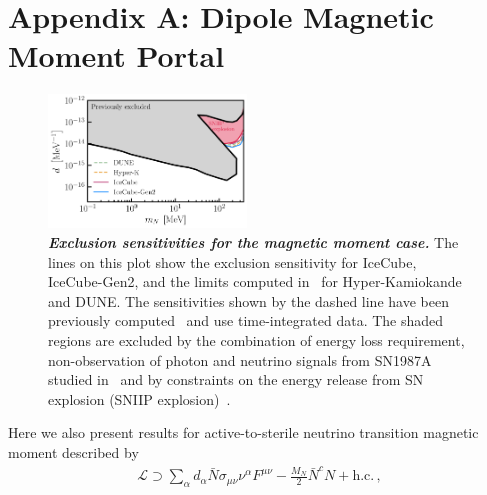 \documentclass[aps,twocolumn,prl,showpacs,showkeys,preprintnumbers,superscriptaddress,nobibnotes,floatfix,longbibliography,notitlepage,nofootinbib]{revtex4-2}
\begin{document}
\section{Appendix A: Dipole Magnetic Moment Portal}
\begin{figure}[hb!]
    \centering
    \includegraphics[width=0.47\textwidth]{figures/magnetic_moment_sensitivity}
    \caption{\textbf{\textit{Exclusion sensitivities for the magnetic moment case.}}
    The lines on this plot show the exclusion sensitivity for IceCube, IceCube-Gen2, and the limits computed in~\cite{Brdar:2023tmi} for Hyper-Kamiokande and DUNE. 
    The sensitivities shown by the dashed line have been previously computed~\cite{Brdar:2023tmi} and use time-integrated data.
    The shaded regions are excluded by the combination of energy loss requirement, non-observation of photon and neutrino signals from SN1987A studied in~\cite{Brdar:2023tmi} and by constraints on the energy release from SN explosion (SNIIP explosion)~\cite{PhysRevLett.128.221103, chauhan2024probing}.
    }
    \label{fig:magnetic_moment_sensitivity}
\end{figure}
Here we also present results for active-to-sterile neutrino transition magnetic moment described by~\cite{Magill:2018jla,Brdar:2020quo,Brdar:2023tmi}
\begin{align}
    \mathcal{L} \supset \sum_\alpha d_\alpha \bar{N}\sigma_{\mu\nu} \nu^{\alpha} F^{\mu\nu}-\frac{M_N}{2} \bar{N}^c N + \text{h.c.}\,,
    \label{eq:Lag}
\end{align}
\end{document}
